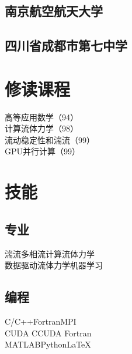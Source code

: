 \documentclass[]{deedy-resume-openfont}
\begin{document}
\begin{minipage}[t]{0.25\textwidth}
    \subsection{南京航空航天大学}
    \sectionsep

    \subsection{四川省成都市第七中学}
    \sectionsep


    \section{修读课程}
    \sectionsep    %
    高等应用数学（94） \\
    计算流体力学（98） \\
    流动稳定性和湍流（99） \\
    GPU并行计算（99） \\
    \sectionsep


    \section{技能}
    \sectionsep
    \subsection{专业}
    湍流\textbullet{}多相流\textbullet{}计算流体力学 \\
    数据驱动流体力学\textbullet{}机器学习\\
    \sectionsep
    \subsection{编程}
    C/C++\textbullet{}Fortran\textbullet{}MPI \\
    CUDA C\textbullet{}CUDA Fortran \\
    MATLAB\textbullet{}Python\textbullet{}\LaTeX \\
    \sectionsep


\end{minipage}
\end{document}
